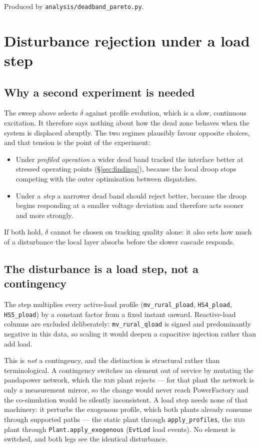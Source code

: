 \documentclass[11pt,a4paper]{article}
\newcommand{\rms}{\textsc{rms}}
\newcommand{\dz}{\ensuremath{\delta}}
\begin{document}
Produced by \texttt{analysis/deadband\_pareto.py}.

\section{Disturbance rejection under a load step}
\label{sec:step}

\subsection{Why a second experiment is needed}

The sweep above selects $\dz$ against profile evolution, which is a slow,
continuous excitation. It therefore says nothing about how the dead zone behaves
when the system is displaced abruptly. The two regimes plausibly favour opposite
choices, and that tension is the point of the experiment:

\begin{itemize}
  \item Under \emph{profiled operation} a wider dead band tracked the interface
    better at stressed operating points (\S\ref{sec:findings}), because the
    local droop stops competing with the outer optimisation between dispatches.
  \item Under a \emph{step} a narrower dead band should reject better, because
    the droop begins responding at a smaller voltage deviation and therefore
    acts sooner and more strongly.
\end{itemize}

If both hold, $\dz$ cannot be chosen on tracking quality alone: it also sets how
much of a disturbance the local layer absorbs before the slower cascade
responds.

\subsection{The disturbance is a load step, not a contingency}

The step multiplies every active-load profile
(\texttt{mv\_rural\_pload}, \texttt{HS4\_pload}, \texttt{HS5\_pload}) by a
constant factor from a fixed instant onward. Reactive-load columns are excluded
deliberately: \texttt{mv\_rural\_qload} is signed and predominantly negative in
this data, so scaling it would deepen a capacitive injection rather than add
load.

This is \emph{not} a contingency, and the distinction is structural rather than
terminological. A contingency switches an element out of service by mutating the
pandapower network, which the \rms{} plant rejects --- for that plant the
network is only a measurement mirror, so the change would never reach
PowerFactory and the co-simulation would be silently inconsistent. A load step
needs none of that machinery: it perturbs the exogenous profile, which both
plants already consume through supported paths --- the static plant through
\texttt{apply\_profiles}, the \rms{} plant through
\texttt{Plant.apply\_exogenous} (\texttt{EvtLod} load events). No element is
switched, and both legs see the identical disturbance.
\end{document}
